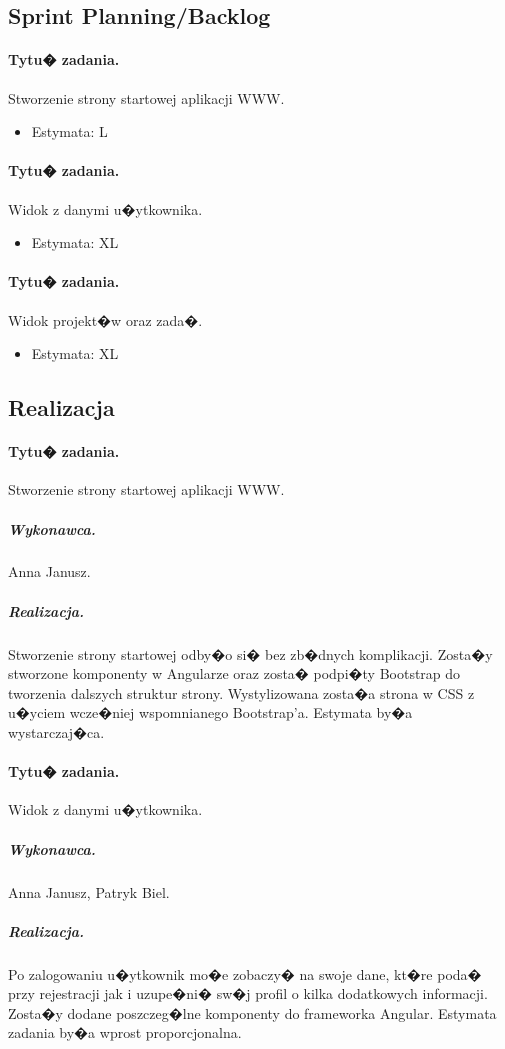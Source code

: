﻿\documentclass[a4paper]{article}
\begin{document}
\subsection{Sprint Planning/Backlog}

\paragraph{Tytu� zadania.} Stworzenie strony startowej aplikacji WWW.
\begin{itemize}
\item Estymata: L
\end{itemize}

\paragraph{Tytu� zadania.} Widok z danymi u�ytkownika.
\begin{itemize}
\item Estymata: XL
\end{itemize}

\paragraph{Tytu� zadania.} Widok projekt�w oraz zada�.
\begin{itemize}
\item Estymata: XL
\end{itemize}


\subsection{Realizacja}

\paragraph{Tytu� zadania.} Stworzenie strony startowej aplikacji WWW.
\subparagraph{Wykonawca.} Anna Janusz.
\subparagraph{Realizacja.} Stworzenie strony startowej odby�o si� bez zb�dnych komplikacji. Zosta�y stworzone komponenty w Angularze oraz zosta� podpi�ty Bootstrap do tworzenia dalszych struktur strony. Wystylizowana zosta�a strona w CSS z u�yciem wcze�niej wspomnianego Bootstrap'a. Estymata by�a wystarczaj�ca.

\paragraph{Tytu� zadania.} Widok z danymi u�ytkownika.
\subparagraph{Wykonawca.} Anna Janusz, Patryk Biel.
\subparagraph{Realizacja.} Po zalogowaniu u�ytkownik mo�e zobaczy� na swoje dane, kt�re poda� przy rejestracji jak i uzupe�ni� sw�j profil o kilka dodatkowych informacji. Zosta�y dodane poszczeg�lne komponenty do frameworka Angular.
Estymata zadania by�a wprost proporcjonalna. 
\end{document}
